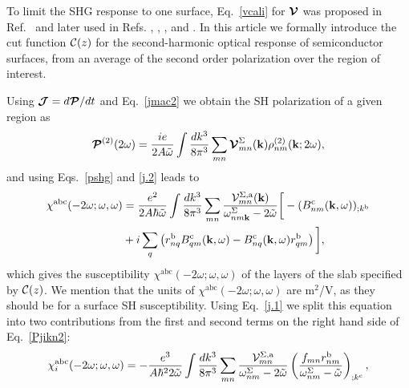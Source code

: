 \documentclass[floatfix,prb,aps,superscriptaddress,showpacs,11pt,preprint,letterpaper]{revtex4}
\begin{document}
To limit the SHG response to one surface, Eq.~\eqref{vcali} 
for $\boldsymbol{\mathcal{\cal V}}$ was proposed in 
Ref.~ and later used in Refs.
,
,
,
 and . 
In this article we formally introduce the cut function ${\mathbf{\cal C}}(z)$ 
for the second-harmonic optical response of semiconductor surfaces,
from an average of the second order polarization over the region of interest.

Using
$\boldsymbol{\mathcal{\cal J}}=d\boldsymbol{\mathcal{\cal P}}/dt$ 
and Eq.~\eqref{jmac2} 
we obtain the SH polarization of a given region as
\begin{equation}
\boldsymbol{\mathcal{\cal P}}^{(2)}(2\omega)
=\frac{ie}{2A\tilde\omega}
\int \frac{dk^3}{8\pi^3}
\sum_{mn}
\boldsymbol{\mathcal{\cal V}}^{\Sigma}_{mn}(\mathbf{k})
\rho^{(2)}_{nm}(\mathbf{k};2\omega)
,
\label{Pjikn}
\end{equation}
and using Eqs.~\eqref{pshg} and \eqref{j.2} 
leads to
\begin{align}
\chi^{\mathrm{a}\mathrm{b}\mathrm{c}}(-2\omega;\omega,\omega) 
&=
\frac{e^2}{2A\hbar\tilde\omega}
\int \frac{dk^3}{8\pi^3}
\sum_{mn}
\frac{{\mathbf{\cal V}}^{\Sigma,\mathrm{a}}_{mn}(\mathbf{k})}
{\omega^\Sigma_{nm\mathbf{k}}-2\tilde\omega}
\bigg[
-(B_{nm}^{\mathrm{c}}(\mathbf{k},\omega))_{;k^{\mathrm{b}}}
\nonumber \\
&
+i\sum_q\left(r_{nq}^{\mathrm{b}}B_{qm}^{\mathrm{c}}(\mathbf{k},\omega) -
  B_{nq}^{\mathrm{c}}(\mathbf{k},\omega) 
  r_{qm}^{\mathrm{b}}\right)
\bigg]
,
\label{Pjikn2}
\end{align}
which gives the susceptibility 
$\chi^{\mathrm{a}\mathrm{b}\mathrm{c}}(-2\omega;\omega,\omega)$ 
of the layers of the slab specified by ${\mathbf{\cal C}}(z)$. 
We mention that the units of 
$\chi^{\mathrm{a}\mathrm{b}\mathrm{c}}(-2\omega;\omega,\omega)$
are m$^2$/V, as they should be for a surface SH susceptibility.
Using Eq.~\eqref{j.1} we
split this equation into
two contributions from the first and second terms on the right hand side
of Eq.~\eqref{Pjikn2}:
\begin{equation}
\chi^{\mathrm{a}\mathrm{b}\mathrm{c}}_i (-2\omega;\omega,\omega)
=-\frac{e^3}{A\hbar^22\tilde\omega}
\int \frac{dk^3}{8\pi^3}
\sum_{mn}
\frac{{\mathbf{\cal V}}_{mn}^{\Sigma,\mathrm{a}}}{\omega^\Sigma_{nm}-2\tilde\omega}
\left(\frac{f_{mn}r_{nm}^{\mathrm{b}}}{\omega^\Sigma_{nm}-\tilde\omega}\right)_{;k^{\mathrm{c}}}
,
\label{chii}
\end{equation} 
\end{document}
